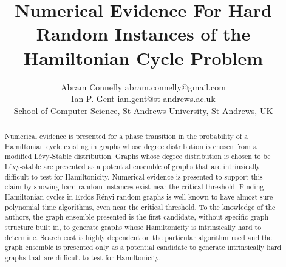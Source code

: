 \documentclass[twoside,11pt]{article}
\begin{document}
\title{ Numerical Evidence For Hard Random Instances of the Hamiltonian Cycle Problem }
\author{\name Abram Connelly \email abram.connelly@gmail.com\\
\name Ian P. Gent \email ian.gent@st-andrews.ac.uk \\
       \addr School of Computer Science,  St Andrews University, St Andrews, UK}


\maketitle

\begin{abstract}
Numerical evidence is presented for a phase transition in the probability
of a Hamiltonian cycle existing in graphs whose degree distribution is
chosen from a modified L\'evy-Stable distribution.
Graphs whose degree distribution is chosen to be L\'evy-stable are
presented as a potential ensemble of graphs that are intrinsically difficult
to test for Hamiltonicity.
Numerical evidence is presented 
to support this claim by showing hard random instances
exist near the critical threshold.  
Finding Hamiltonian cycles in Erd\"os-R\'enyi random graphs is well
known to have almost sure polynomial time algorithms, even near
the critical threshold.
To the knowledge of the authors, the graph ensemble presented is the
first candidate, without specific graph structure built
in, to generate graphs whose Hamiltonicity is intrinsically hard to
determine.
Search cost is highly dependent on the particular algorithm used
and the graph ensemble is presented only as a potential candidate
to generate intrinsically hard graphs that are difficult to test for Hamiltonicity.


\end{abstract}
\end{document}
